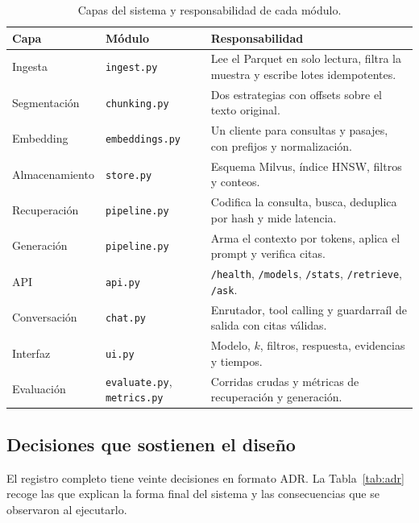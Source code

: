 \documentclass[11pt]{tg_usta}
\begin{document}
\begin{table}[htbp]
\centering
\footnotesize
\begin{tabular}{@{}p{2.2cm}p{4.4cm}p{8.4cm}@{}}
\toprule
Capa & Módulo & Responsabilidad \\
\midrule
Ingesta & \texttt{ingest.py} & Lee el Parquet en solo lectura, filtra la muestra y escribe lotes idempotentes. \\
Segmentación & \texttt{chunking.py} & Dos estrategias con offsets sobre el texto original. \\
Embedding & \texttt{embeddings.py} & Un cliente para consultas y pasajes, con prefijos y normalización. \\
Almacenamiento & \texttt{store.py} & Esquema Milvus, índice HNSW, filtros y conteos. \\
Recuperación & \texttt{pipeline.py} & Codifica la consulta, busca, deduplica por hash y mide latencia. \\
Generación & \texttt{pipeline.py} & Arma el contexto por tokens, aplica el prompt y verifica citas. \\
API & \texttt{api.py} & \texttt{/health}, \texttt{/models}, \texttt{/stats}, \texttt{/retrieve}, \texttt{/ask}. \\
Conversación & \texttt{chat.py} & Enrutador, tool calling y guardarraíl de salida con citas válidas. \\
Interfaz & \texttt{ui.py} & Modelo, $k$, filtros, respuesta, evidencias y tiempos. \\
Evaluación & \texttt{evaluate.py}, \texttt{metrics.py} & Corridas crudas y métricas de recuperación y generación. \\
\bottomrule
\end{tabular}
\caption{Capas del sistema y responsabilidad de cada módulo.}
\label{tab:capas}
\end{table}

\subsection{Decisiones que sostienen el diseño}

El registro completo tiene veinte decisiones en formato ADR. La Tabla~\ref{tab:adr} recoge las que explican la forma final del sistema y las consecuencias que se observaron al ejecutarlo.
\end{document}
